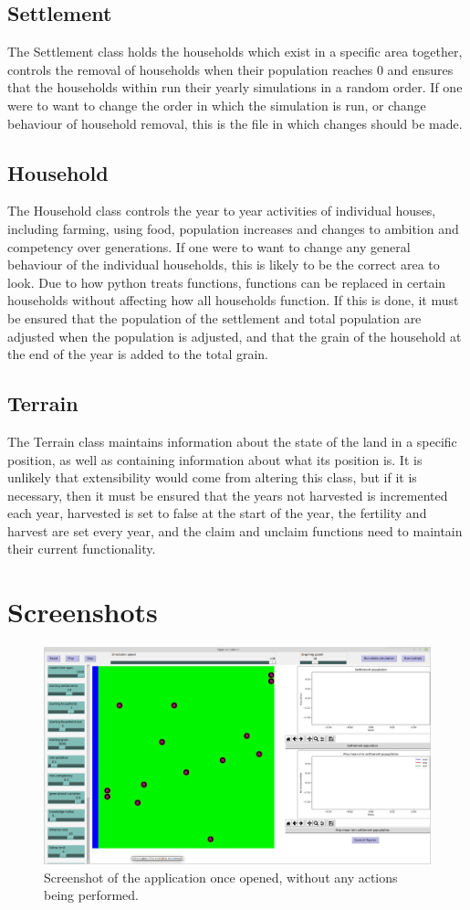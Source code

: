 \documentclass[12pt]{article}
\begin{document}
			\subsection{Settlement}
				The Settlement class holds the households which exist in a specific area together, controls the removal of households when their population reaches 0 and ensures that the households within run their yearly simulations in a random order. If one were to want to change the order in which the simulation is run, or change behaviour of household removal, this is the file in which changes should be made.
			\subsection{Household}
				The Household class controls the year to year activities of individual houses, including farming, using food, population increases and changes to ambition and competency over generations. If one were to want to change any general behaviour of the individual households, this is likely to be the correct area to look. Due to how python treats functions, functions can be replaced in certain households without affecting how all households function. If this is done, it must be ensured that the population of the settlement and total population are adjusted when the population is adjusted, and that the grain of the household at the end of the year is added to the total grain.
			\subsection{Terrain}
				The Terrain class maintains information about the state of the land in a specific position, as well as containing information about what its position is. It is unlikely that extensibility would come from altering this class, but if it is necessary, then it must be ensured that the years not harvested is incremented each year, harvested is set to false at the start of the year, the fertility and harvest are set every year, and the claim and unclaim functions need to maintain their current functionality. 
	\section{Screenshots}
	\begin{figure}[!htb]
		\includegraphics[width=15cm]{OnOpen}
		\caption{Screenshot of the application once opened, without any actions being performed.}
		\label{fig:OnOpen}
	\end{figure}
	
\end{document}
